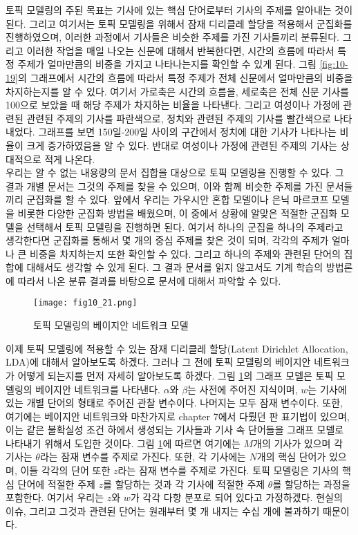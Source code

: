 \documentclass[a4paper]{oblivoir}
\begin{document}
토픽 모델링의 주된 목표는 기사에 있는 핵심 단어로부터 기사의 주제를 알아내는 것이 된다. 그리고 여기서는 토픽 모델링을 위해서 잠재 디리클레 할당을 적용해서 군집화를 진행하였으며, 이러한 과정에서 기사들은 비슷한 주제를 가진 기사들끼리 분류된다. 그리고 이러한 작업을 매일 나오는 신문에 대해서 반복한다면, 시간의 흐름에 따라서 특정 주제가 얼마만큼의 비중을 가지고 나타나는지를 확인할 수 있게 된다. 그림 \ref{fig:10-19}의 그래프에서 시간의 흐름에 따라서 특정 주제가 전체 신문에서 얼마만큼의 비중을 차지하는지를 알 수 있다. 여기서 가로축은 시간의 흐름을, 세로축은 전체 신문 기사를 100으로 보았을 때 해당 주제가 차지하는 비율을 나타낸다. 그리고 여성이나 가정에 관련된 관련된 주제의 기사를 파란색으로, 정치와 관련된 주제의 기사를 빨간색으로 나타내었다. 그래프를 보면 150일-200일 사이의 구간에서 정치에 대한 기사가 나타나는 비율이 크게 증가하였음을 알 수 있다. 반대로 여성이나 가정에 관련된 주제의 기사는 상대적으로 적게 나온다. \\

우리는 알 수 없는 내용량의 문서 집합을 대상으로 토픽 모델링을 진행할 수 있다. 그 결과 개별 문서는 그것의 주제를 찾을 수 있으며, 이와 함께 비슷한 주제를 가진 문서들끼리 군집화를 할 수 있다. 앞에서 우리는 가우시안 혼합 모델이나 은닉 마르코프 모델을 비롯한 다양한 군집화 방법을 배웠으며, 이 중에서 상황에 알맞은 적절한 군집화 모델을 선택해서 토픽 모델링을 진행하면 된다. 여기서 하나의 군집을 하나의 주제라고 생각한다면 군집화를 통해서 몇 개의 중심 주제를 찾은 것이 되며, 각각의 주제가 얼마나 큰 비중을 차지하는지 또한 확인할 수 있다. 그리고 하나의 주제와 관련된 단어의 집합에 대해서도 생각할 수 있게 된다. 그 결과 문서를 읽지 않고서도 기계 학습의 방법론에 따라서 나온 분류 결과를 바탕으로 문서에 대해서 파악할 수 있다. \\

\begin{figure}[ht] \centering 
\texttt{[image: fig10\_21.png]} 
\caption{토픽 모델링의 베이지안 네트워크 모델}
\label{fig:10-20}
\end{figure}

이제 토픽 모델링에 적용할 수 있는 잠재 디리클레 할당(Latent Dirichlet Allocation, LDA)에 대해서 알아보도록 하겠다. 그러나 그 전에 토픽 모델링의 베이지안 네트워크가 어떻게 되는지를 먼저 자세히 알아보도록 하겠다. 그림 \ref{fig:10-20}의 그래프 모델은 토픽 모델링의 베이지안 네트워크를 나타낸다. $\alpha$와 $\beta$는 사전에 주어진 지식이며, $w$는 기사에 있는 개별 단어의 형태로 주어진 관찰 변수이다. 나머지는 모두 잠재 변수이다. 또한, 여기에는 베이지안 네트워크와 마찬가지로 chapter 7에서 다뤘던 판 표기법이 있으며, 이는 같은 불확실성 조건 하에서 생성되는 기사들과 기사 속 단어들을 그래프 모델로 나타내기 위해서 도입한 것이다. 그림 \ref{fig:10-20}에 따르면 여기에는 $M$개의 기사가 있으며 각 기사는 $\theta$라는 잠재 변수를 주제로 가진다. 또한, 각 기사에는 $N$개의 핵심 단어가 있으며, 이들 각각의 단어 또한 $z$라는 잠재 변수를 주제로 가진다. 토픽 모델링은 기사의 핵심 단어에 적절한 주제 $z$를 할당하는 것과 각 기사에 적절한 주제 $\theta$를 할당하는 과정을 포함한다. 여기서 우리는 $z$와 $w$가 각각 다항 분포로 되어 있다고 가정하겠다. 현실의 이슈, 그리고 그것과 관련된 단어는 원래부터 몇 개 내지는 수십 개에 불과하기 때문이다. \\
\end{document}
